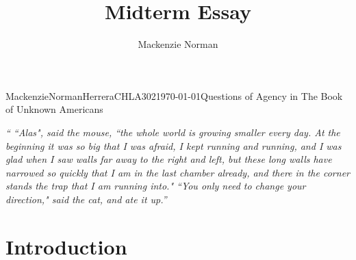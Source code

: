 \documentclass{article}
\title{Midterm Essay}
\author{Mackenzie Norman}
\begin{document}
\begin{mla}{Mackenzie}{Norman}{Herrera}{CHLA302}{\today}{Questions of Agency in The Book of Unknown Americans}

\noindent\textit{`` ``Alas", said the mouse, ``the whole world is growing smaller every day. At the beginning it was so big that I was afraid, I kept running and running, and I was glad when I saw walls far away to the right and left, but these long walls have narrowed so quickly that I am in the last chamber already, and there in the corner stands the trap that I am running into." \linebreak \linebreak ``You only need to change your direction," said the cat, and ate it up.''}\cite{eine-fable}

\section*{Introduction}

\end{mla}
\end{document}
